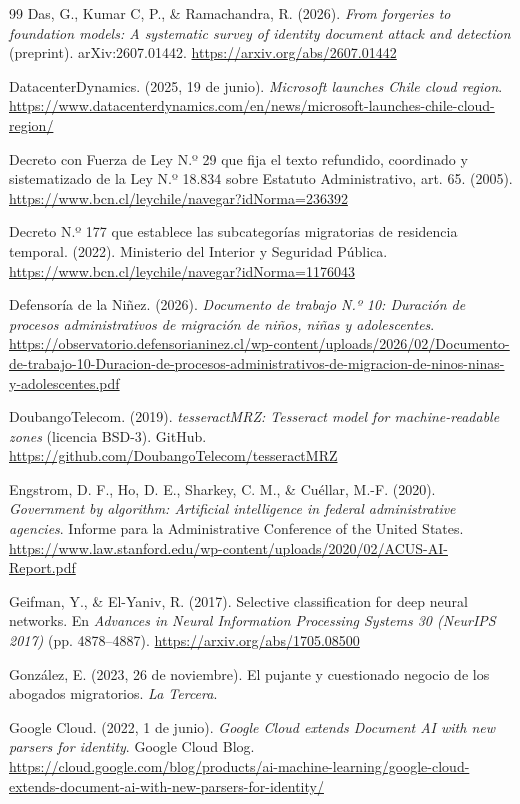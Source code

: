 \documentclass[11pt,a4paper]{article}
\begin{document}
\begin{thebibliography}{99}
Das, G., Kumar C, P., \& Ramachandra, R. (2026). \emph{From forgeries to foundation models: A systematic survey of identity document attack and detection} (preprint). arXiv:2607.01442. \url{https://arxiv.org/abs/2607.01442}

DatacenterDynamics. (2025, 19 de junio). \emph{Microsoft launches Chile cloud region}. \url{https://www.datacenterdynamics.com/en/news/microsoft-launches-chile-cloud-region/}

Decreto con Fuerza de Ley N.º 29 que fija el texto refundido, coordinado y sistematizado de la Ley N.º 18.834 sobre Estatuto Administrativo, art. 65. (2005). \url{https://www.bcn.cl/leychile/navegar?idNorma=236392}

Decreto N.º 177 que establece las subcategorías migratorias de residencia temporal. (2022). Ministerio del Interior y Seguridad Pública. \url{https://www.bcn.cl/leychile/navegar?idNorma=1176043}

Defensoría de la Niñez. (2026). \emph{Documento de trabajo N.º 10: Duración de procesos administrativos de migración de niños, niñas y adolescentes}. \url{https://observatorio.defensorianinez.cl/wp-content/uploads/2026/02/Documento-de-trabajo-10-Duracion-de-procesos-administrativos-de-migracion-de-ninos-ninas-y-adolescentes.pdf}

DoubangoTelecom. (2019). \emph{tesseractMRZ: Tesseract model for machine-readable zones} (licencia BSD-3). GitHub. \url{https://github.com/DoubangoTelecom/tesseractMRZ}

Engstrom, D. F., Ho, D. E., Sharkey, C. M., \& Cuéllar, M.-F. (2020). \emph{Government by algorithm: Artificial intelligence in federal administrative agencies}. Informe para la Administrative Conference of the United States. \url{https://www.law.stanford.edu/wp-content/uploads/2020/02/ACUS-AI-Report.pdf}

Geifman, Y., \& El-Yaniv, R. (2017). Selective classification for deep neural networks. En \emph{Advances in Neural Information Processing Systems 30 (NeurIPS 2017)} (pp. 4878--4887). \url{https://arxiv.org/abs/1705.08500}

González, E. (2023, 26 de noviembre). El pujante y cuestionado negocio de los abogados migratorios. \emph{La Tercera}.

Google Cloud. (2022, 1 de junio). \emph{Google Cloud extends Document AI with new parsers for identity}. Google Cloud Blog. \url{https://cloud.google.com/blog/products/ai-machine-learning/google-cloud-extends-document-ai-with-new-parsers-for-identity/}


\end{thebibliography}
\end{document}
